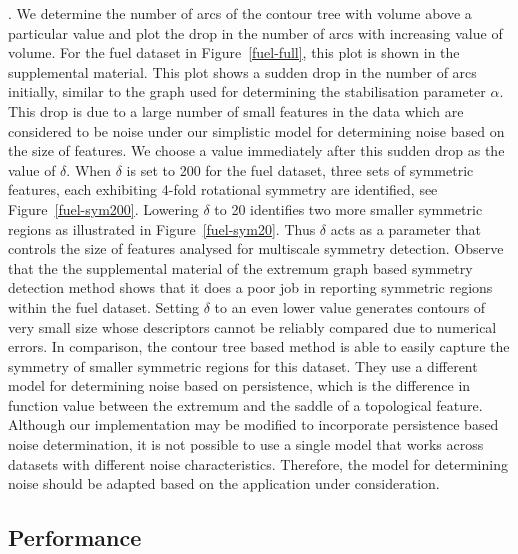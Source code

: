 \documentclass[review,journal]{vgtc}         %
\begin{document}
.
We determine the number of arcs of the contour tree with volume above a particular value and plot
the drop in the number of arcs with increasing value of volume. For the fuel dataset in 
Figure~\ref{fuel-full}, this plot is shown in the supplemental material. This plot shows a sudden
drop in the number of arcs initially, similar to the graph used for determining the stabilisation
parameter $\alpha$. This drop is due to a large number of small features in the data which are 
considered to be noise under our simplistic model for determining noise based on the size of features.
We choose a value immediately after this sudden drop as the value of $\delta$. When
$\delta$ is set to 200 for the fuel dataset, three sets of symmetric features, each exhibiting
4-fold rotational symmetry are identified, see Figure~\ref{fuel-sym200}. Lowering $\delta$ to 20
identifies two more smaller symmetric regions as illustrated in Figure~\ref{fuel-sym20}. Thus $\delta$
acts as a parameter that controls the size of features analysed for multiscale symmetry detection.
Observe that the the supplemental material of the extremum graph based symmetry detection method shows 
that it does a poor job in reporting symmetric regions within the fuel dataset. 
Setting $\delta$ to an even lower value generates contours of very small size whose descriptors 
cannot be reliably compared due to numerical errors. In comparison, the contour tree based 
method is able to easily capture the symmetry of smaller symmetric regions for this dataset. 
They use a different model for determining noise based on persistence, which is the difference in 
function value between the extremum and the saddle of a topological feature. 
Although our implementation may be modified to incorporate
persistence based noise determination, it is not possible to use a single model that works across
datasets with different noise characteristics. Therefore, the model for determining noise should
be adapted based on the application under consideration. 
\subsection{Performance}
\end{document}
